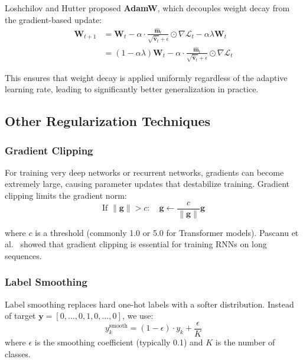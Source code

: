 Loshchilov and Hutter \cite{loshchilov2019decoupled} proposed \textbf{AdamW}, which decouples weight decay from the gradient-based update:
\begin{align}
\mathbf{W}_{t+1} &= \mathbf{W}_t - \alpha \cdot \frac{\hat{\mathbf{m}}_t}{\sqrt{\hat{\mathbf{v}}_t} + \epsilon} \odot \nabla \mathcal{L}_t - \alpha\lambda \mathbf{W}_t \\
&= (1 - \alpha\lambda)\mathbf{W}_t - \alpha \cdot \frac{\hat{\mathbf{m}}_t}{\sqrt{\hat{\mathbf{v}}_t} + \epsilon} \odot \nabla \mathcal{L}_t
\end{align}

This ensures that weight decay is applied uniformly regardless of the adaptive learning rate, leading to significantly better generalization in practice.

\subsection{Other Regularization Techniques}

\subsubsection{Gradient Clipping}

For training very deep networks or recurrent networks, gradients can become extremely large, causing parameter updates that destabilize training. Gradient clipping limits the gradient norm:
\begin{equation}
\text{If } \|\mathbf{g}\| > c: \quad \mathbf{g} \leftarrow \frac{c}{\|\mathbf{g}\|}\mathbf{g}
\end{equation}

where $c$ is a threshold (commonly 1.0 or 5.0 for Transformer models). Pascanu et al.\ \cite{pascanu2013difficulty} showed that gradient clipping is essential for training RNNs on long sequences.

\subsubsection{Label Smoothing}

Label smoothing \cite{szegedy2016rethinking} replaces hard one-hot labels with a softer distribution. Instead of target $\mathbf{y} = [0, \ldots, 0, 1, 0, \ldots, 0]$, we use:
\begin{equation}
y_k^{\text{smooth}} = (1 - \epsilon)\cdot y_k + \frac{\epsilon}{K}
\end{equation}
where $\epsilon$ is the smoothing coefficient (typically 0.1) and $K$ is the number of classes.


